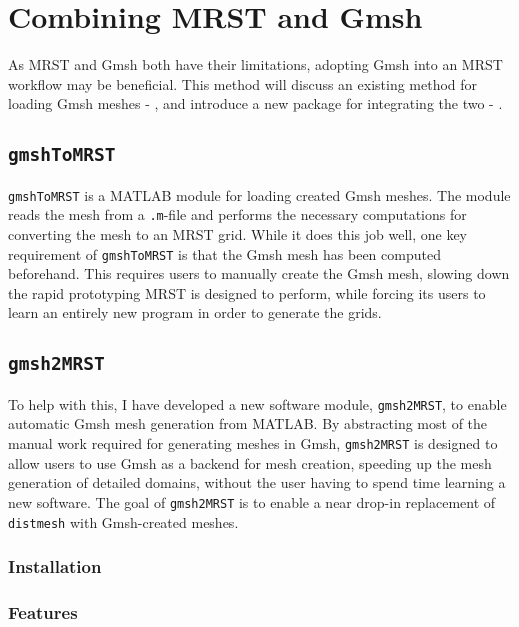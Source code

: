 \section{Combining MRST and Gmsh}
\label{sec:combining}
As MRST and Gmsh both have their limitations, adopting Gmsh into an MRST workflow may be beneficial. This method will discuss an existing method for loading Gmsh meshes - , and introduce a new package for integrating the two - .

\subsection{\texttt{gmshToMRST}}
\label{sec:GmshToMRST}
\verb|gmshToMRST| is a MATLAB module for loading created Gmsh meshes. The module reads the mesh from a \verb|.m|-file and performs the necessary computations for converting the mesh to an MRST grid. While it does this job well, one key requirement of \verb|gmshToMRST| is that the Gmsh mesh has been computed beforehand. This requires users to manually create the Gmsh mesh, slowing down the rapid prototyping MRST is designed to perform, while forcing its users to learn an entirely new program in order to generate the grids.

\subsection{\texttt{gmsh2MRST}}
\label{sec:own_software}
To help with this, I have developed a new software module, \verb|gmsh2MRST|, to enable automatic Gmsh mesh generation from MATLAB. By abstracting most of the manual work required for generating meshes in Gmsh, \verb|gmsh2MRST| is designed to allow users to use Gmsh as a backend for mesh creation, speeding up the mesh generation of detailed domains, without the user having to spend time learning a new software. The goal of \verb|gmsh2MRST| is to enable a near drop-in replacement of \verb|distmesh| with Gmsh-created meshes.


\subsubsection{Installation}

\subsubsection{Features}

